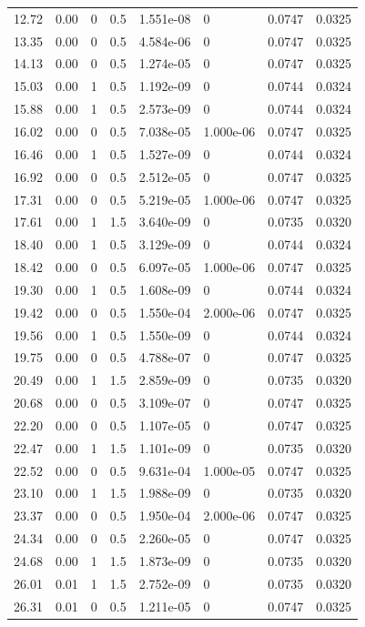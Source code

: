 \documentclass[preview]{standalone}
\begin{document}
{{\begin{tabular}{L{1.2cm}C{1.2cm} C{0.3cm}C{0.5cm} C{1.4cm}C{1.4cm} C{1.4cm}C{1.4cm}}
  12.72  &  0.00  & 0     & 0.5 &  1.551e-08  & 0  & 0.0747 &  0.0325   \\ 
  13.35  &  0.00  & 0     & 0.5 &  4.584e-06  & 0  & 0.0747 &  0.0325   \\ 
  14.13  &  0.00  & 0     & 0.5 &  1.274e-05  & 0  & 0.0747 &  0.0325   \\ 
  15.03  &  0.00  & 1     & 0.5 &  1.192e-09  & 0  & 0.0744 &  0.0324   \\ 
  15.88  &  0.00  & 1     & 0.5 &  2.573e-09  & 0  & 0.0744 &  0.0324   \\ 
  16.02  &  0.00  & 0     & 0.5 &  7.038e-05  & 1.000e-06  & 0.0747 &  0.0325   \\ 
  16.46  &  0.00  & 1     & 0.5 &  1.527e-09  & 0  & 0.0744 &  0.0324   \\ 
  16.92  &  0.00  & 0     & 0.5 &  2.512e-05  & 0  & 0.0747 &  0.0325   \\ 
  17.31  &  0.00  & 0     & 0.5 &  5.219e-05  & 1.000e-06  & 0.0747 &  0.0325   \\ 
  17.61  &  0.00  & 1     & 1.5 &  3.640e-09  & 0  & 0.0735 &  0.0320   \\ 
  18.40  &  0.00  & 1     & 0.5 &  3.129e-09  & 0  & 0.0744 &  0.0324   \\ 
  18.42  &  0.00  & 0     & 0.5 &  6.097e-05  & 1.000e-06  & 0.0747 &  0.0325   \\ 
  19.30  &  0.00  & 1     & 0.5 &  1.608e-09  & 0  & 0.0744 &  0.0324   \\ 
  19.42  &  0.00  & 0     & 0.5 &  1.550e-04  & 2.000e-06  & 0.0747 &  0.0325   \\ 
  19.56  &  0.00  & 1     & 0.5 &  1.550e-09  & 0  & 0.0744 &  0.0324   \\ 
  19.75  &  0.00  & 0     & 0.5 &  4.788e-07  & 0  & 0.0747 &  0.0325   \\ 
  20.49  &  0.00  & 1     & 1.5 &  2.859e-09  & 0  & 0.0735 &  0.0320   \\ 
  20.68  &  0.00  & 0     & 0.5 &  3.109e-07  & 0  & 0.0747 &  0.0325   \\ 
  22.20  &  0.00  & 0     & 0.5 &  1.107e-05  & 0  & 0.0747 &  0.0325   \\ 
  22.47  &  0.00  & 1     & 1.5 &  1.101e-09  & 0  & 0.0735 &  0.0320   \\ 
  22.52  &  0.00  & 0     & 0.5 &  9.631e-04  & 1.000e-05  & 0.0747 &  0.0325   \\ 
  23.10  &  0.00  & 1     & 1.5 &  1.988e-09  & 0  & 0.0735 &  0.0320   \\ 
  23.37  &  0.00  & 0     & 0.5 &  1.950e-04  & 2.000e-06  & 0.0747 &  0.0325   \\ 
  24.34  &  0.00  & 0     & 0.5 &  2.260e-05  & 0  & 0.0747 &  0.0325   \\ 
  24.68  &  0.00  & 1     & 1.5 &  1.873e-09  & 0  & 0.0735 &  0.0320   \\ 
  26.01  &  0.01  & 1     & 1.5 &  2.752e-09  & 0  & 0.0735 &  0.0320   \\ 
  26.31  &  0.01  & 0     & 0.5 &  1.211e-05  & 0  & 0.0747 &  0.0325   \\ 
\hline 
\end{tabular} 

}}
\end{document}
